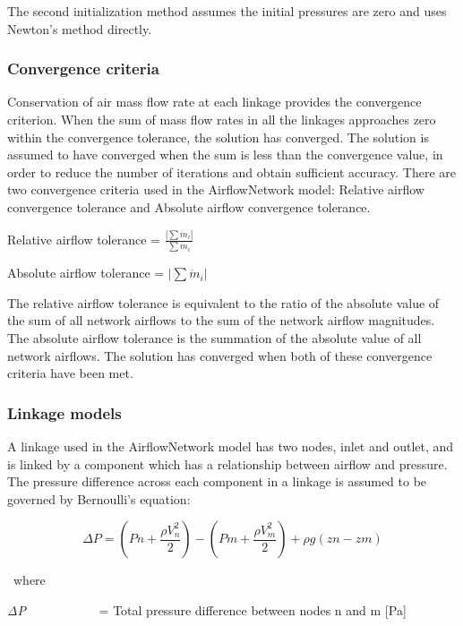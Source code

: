 The second initialization method assumes the initial pressures are zero and uses Newton's method directly.

\subsubsection{Convergence criteria}\label{convergence-criteria}

Conservation of air mass flow rate at each linkage provides the convergence criterion. When the sum of mass flow rates in all the linkages approaches zero within the convergence tolerance, the solution has converged. The solution is assumed to have converged when the sum is less than the convergence value, in order to reduce the number of iterations and obtain sufficient accuracy. There are two convergence criteria used in the AirflowNetwork model: Relative airflow convergence tolerance and Absolute airflow convergence tolerance.

Relative airflow tolerance = \(\frac{\left| \sum \dot m_i \right|}{\sum \dot m_i}\)

Absolute airflow tolerance = \(\left| \sum \dot m_i \right|\)

The relative airflow tolerance is equivalent to the ratio of the absolute value of the sum of all network airflows to the sum of the network airflow magnitudes.~ The absolute airflow tolerance is the summation of the absolute value of all network airflows. The solution has converged when both of these convergence criteria have been met.

\subsubsection{Linkage models}\label{linkage-models}

A linkage used in the AirflowNetwork model has two nodes, inlet and outlet, and is linked by a component which has a relationship between airflow and pressure.~ The pressure difference across each component in a linkage is assumed to be governed by Bernoulli's equation:

\begin{equation}
\Delta P = \left( {Pn + \frac{{\rho V_n^2}}{2}} \right) - \left( {Pm + \frac{{\rho V_m^2}}{2}} \right) + \rho g\left( {zn - zm} \right)
\end{equation}

~where

\emph{ΔP}~~~~~~~~~~~ = Total pressure difference between nodes n and m {[}Pa{]}

